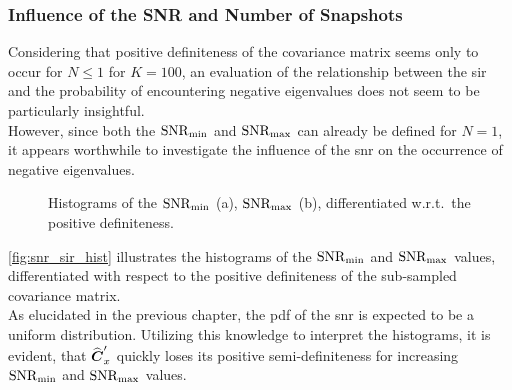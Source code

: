 \subsubsection{Influence of the SNR and Number of Snapshots}
Considering that positive definiteness of the covariance matrix seems only to occur for \( N \leq 1 \) for \( K = 100 \),
an evaluation of the relationship between the \gls{sir} and the probability of encountering negative eigenvalues
does not seem to be particularly insightful.\\
However, since both the \( \mathrm{SNR}_{\min} \) and \( \mathrm{SNR}_{\max} \) can already be defined for \( N = 1 \), it appears worthwhile to
investigate the influence of the \gls{snr} on the occurrence of negative eigenvalues.

\begin{figure}[H]
    \centering
    \caption{Histograms of the \( \mathrm{SNR}_{\min} \) (a), \( \mathrm{SNR}_{\max} \) (b), differentiated w.r.t.\ the positive definiteness.}
    \label{fig:snr_sir_hist}
\end{figure}

\autoref{fig:snr_sir_hist} illustrates the histograms of the \( \mathrm{SNR}_{\min} \) and \( \mathrm{SNR}_{\max} \) values, differentiated with
respect to the positive definiteness of the sub-sampled covariance matrix. \\
As elucidated in the previous chapter, the \gls{pdf} of the \gls{snr} is expected to be a uniform distribution. Utilizing
this knowledge to interpret the histograms, it is evident, that \( \widehat{\boldsymbol{C}}'_x \) quickly loses its positive semi-definiteness
for increasing \( \mathrm{SNR}_{\min} \) and \( \mathrm{SNR}_{\max} \) values.\\


